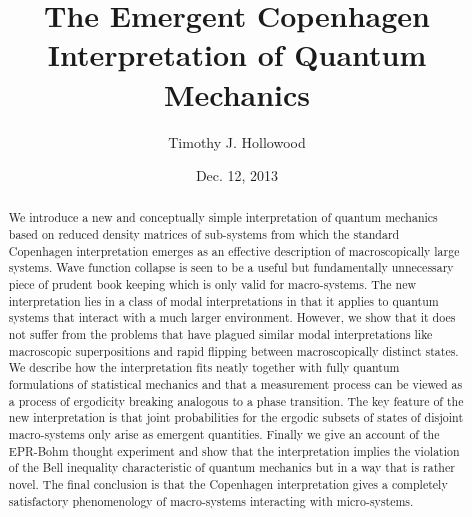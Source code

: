 \documentclass[%
preprint,
nofootinbib,
 amsmath,amssymb,
aps,
]{revtex4-1}
\begin{document}

\title{The Emergent Copenhagen Interpretation of Quantum Mechanics}

\author{Timothy J. Hollowood}

\date{Dec. 12, 2013}

\begin{abstract}
We introduce a new and conceptually simple interpretation of quantum mechanics based on reduced density matrices of sub-systems from which the standard Copenhagen interpretation emerges as an effective description of macroscopically large systems. Wave function collapse is seen to be a useful but fundamentally unnecessary piece of prudent book keeping which is only valid for macro-systems. 
The new interpretation lies in a class of modal interpretations in that it applies to quantum systems that interact with a much larger environment. However, we show that it 
does not suffer from the problems that have plagued similar modal interpretations like 
macroscopic superpositions and rapid flipping between macroscopically distinct states. We describe how the interpretation fits neatly together with fully quantum formulations of statistical mechanics and that 
a measurement process can be viewed as a process of ergodicity breaking analogous to a phase  transition. The key feature of the new interpretation is that joint probabilities for the ergodic subsets of states of disjoint macro-systems only arise as emergent quantities. 
Finally we give an account of the EPR-Bohm thought experiment and show that the interpretation implies the violation of the Bell inequality characteristic of quantum mechanics but in a way that is rather novel. The final conclusion is that the  Copenhagen interpretation gives a completely satisfactory phenomenology of macro-systems interacting with micro-systems.
\end{abstract}

\maketitle

\end{document}
